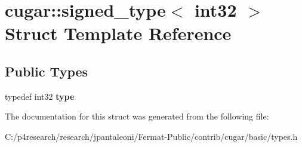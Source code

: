 \hypertarget{structcugar_1_1signed__type_3_01int32_01_4}{}\section{cugar\+:\+:signed\+\_\+type$<$ int32 $>$ Struct Template Reference}
\label{structcugar_1_1signed__type_3_01int32_01_4}
\subsection*{Public Types}
\begin{DoxyCompactItemize}
\item 
\mbox{\label{structcugar_1_1signed__type_3_01int32_01_4_a63fa668226710c2400c3bb3a3fe94108}} 
typedef int32 {\bfseries type}
\end{DoxyCompactItemize}


The documentation for this struct was generated from the following file\+:\begin{DoxyCompactItemize}
\item 
C\+:/p4research/research/jpantaleoni/\+Fermat-\/\+Public/contrib/cugar/basic/types.\+h\end{DoxyCompactItemize}
